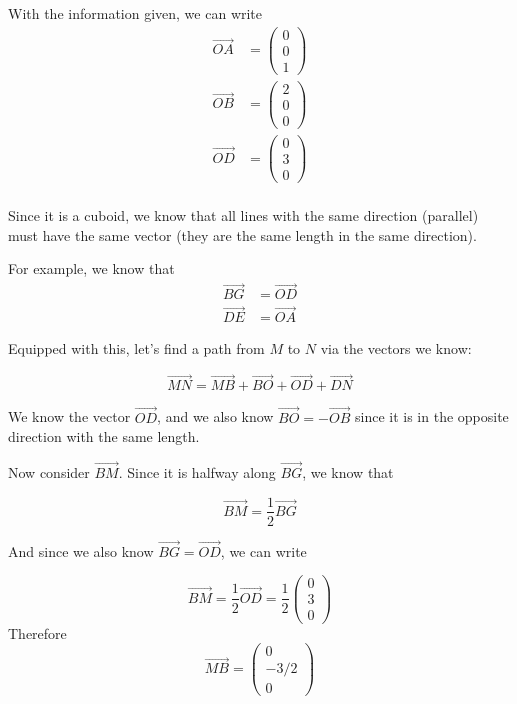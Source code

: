 \begin{solution}
    With the information given, we can write 
    \begin{align}
        \vec{OA} &= \begin{pmatrix}0\\0\\1\end{pmatrix}\\
        \vec{OB} &= \begin{pmatrix}2\\0\\0\end{pmatrix}\\
        \vec{OD} &= \begin{pmatrix}0\\3\\0\end{pmatrix}\\
    \end{align}

    Since it is a cuboid, we know that all lines with the same direction (parallel) must have the same vector (they are the same length in the same direction).

    For example, we know that 
    \begin{align*}
        \vec{BG} &= \vec{OD} \\
        \vec{DE} &= \vec{OA}
    \end{align*}

    Equipped with this, let's find a path from $M$ to $N$ via the vectors we know:

    \[ \vec{MN} = \vec{MB} + \vec{BO} + \vec{OD} + \vec{DN}\]

    We know the vector $\vec{OD}$, and we also know $\vec{BO}=-\vec{OB}$ since it is in the opposite direction with the same length.

    Now consider $\vec{BM}$. Since it is halfway along $\vec{BG}$, we know that 

    \[ \vec{BM} = \frac{1}{2} \vec{BG}\]

    And since we also know $\vec{BG} = \vec{OD}$, we can write 

    \[ \vec{BM} = \frac{1}{2} \vec{OD} = \frac{1}{2} \begin{pmatrix}0\\3\\0\end{pmatrix} \]
    Therefore 
    \[ \vec{MB} = \begin{pmatrix}0\\-3/2\\0\end{pmatrix}\]


\end{solution}

